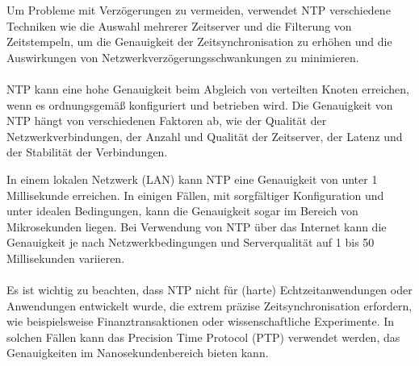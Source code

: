 \documentclass[../vs-script-first-v01.tex]{subfiles}
\begin{document}
Um Probleme mit Verzögerungen zu vermeiden, verwendet NTP verschiedene Techniken wie die Auswahl mehrerer Zeitserver und die Filterung von Zeitstempeln, um die Genauigkeit der Zeitsynchronisation zu erhöhen und die Auswirkungen von Netzwerkverzögerungsschwankungen zu minimieren.
\\\\
NTP kann eine hohe Genauigkeit beim Abgleich von verteilten Knoten erreichen, wenn es ordnungsgemäß konfiguriert und betrieben wird. Die Genauigkeit von NTP hängt von verschiedenen Faktoren ab, wie der Qualität der Netzwerkverbindungen, der Anzahl und Qualität der Zeitserver, der Latenz und der Stabilität der Verbindungen.

In einem lokalen Netzwerk (LAN) kann NTP eine Genauigkeit von unter 1 Millisekunde erreichen. In einigen Fällen, mit sorgfältiger Konfiguration und unter idealen Bedingungen, kann die Genauigkeit sogar im Bereich von Mikrosekunden liegen. Bei Verwendung von NTP über das Internet kann die Genauigkeit je nach Netzwerkbedingungen und Serverqualität auf 1 bis 50 Millisekunden variieren.
\\\\
Es ist wichtig zu beachten, dass NTP nicht für (harte) Echtzeitanwendungen oder Anwendungen entwickelt wurde, die extrem präzise Zeitsynchronisation erfordern, wie beispielsweise Finanztransaktionen oder wissenschaftliche Experimente. In solchen Fällen kann das Precision Time Protocol (PTP) verwendet werden, das Genauigkeiten im Nanosekundenbereich bieten kann.
\end{document}

